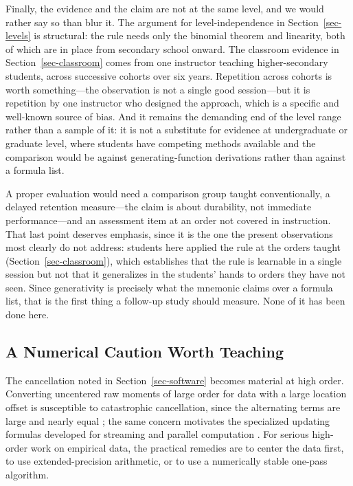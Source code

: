 \documentclass[
  12pt]{article}
\begin{document}
Finally, the evidence and the claim are not at the same level, and we would rather say so than blur it. The argument for level-independence in Section~\ref{sec-levels} is structural: the rule needs only the binomial theorem and linearity, both of which are in place from secondary school onward. The classroom evidence in Section~\ref{sec-classroom} comes from one instructor teaching higher-secondary students, across successive cohorts over six years. Repetition across cohorts is worth something---the observation is not a single good session---but it is repetition by one instructor who designed the approach, which is a specific and well-known source of bias. And it remains the demanding end of the level range rather than a sample of it: it is not a substitute for evidence at undergraduate or graduate level, where students have competing methods available and the comparison would be against generating-function derivations rather than against a formula list.

A proper evaluation would need a comparison group taught conventionally, a delayed retention measure---the claim is about durability, not immediate performance---and an assessment item at an order not covered in instruction. That last point deserves emphasis, since it is the one the present observations most clearly do not address: students here applied the rule at the orders taught (Section~\ref{sec-classroom}), which establishes that the rule is learnable in a single session but not that it generalizes in the students' hands to orders they have not seen. Since generativity is precisely what the mnemonic claims over a formula list, that is the first thing a follow-up study should measure. None of it has been done here.

\subsection{A Numerical Caution Worth Teaching}

The cancellation noted in Section~\ref{sec-software} becomes material at high order. Converting uncentered raw moments of large order for data with a large location offset is susceptible to catastrophic cancellation, since the alternating terms are large and nearly equal \citep{higham2002}; the same concern motivates the specialized updating formulas developed for streaming and parallel computation \citep{chan1983, pebay2016}. For serious high-order work on empirical data, the practical remedies are to center the data first, to use extended-precision arithmetic, or to use a numerically stable one-pass algorithm.
\end{document}
